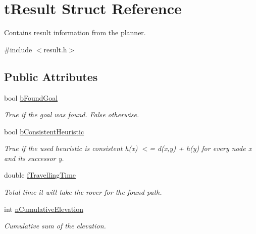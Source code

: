 \hypertarget{structt_result}{}\section{t\+Result Struct Reference}
\label{structt_result}


Contains result information from the planner.  




{\ttfamily \#include $<$result.\+h$>$}

\subsection*{Public Attributes}
\begin{DoxyCompactItemize}
\item 
\mbox{\label{structt_result_add525cabcdd568ffc72a25052d351042}} 
bool \mbox{\hyperlink{structt_result_add525cabcdd568ffc72a25052d351042}{b\+Found\+Goal}}
\begin{DoxyCompactList}\small\item\em True if the goal was found. False otherwise. \end{DoxyCompactList}\item 
bool \mbox{\hyperlink{structt_result_a7d87aab6411a466aed07a27a70eeded2}{b\+Consistent\+Heuristic}}
\begin{DoxyCompactList}\small\item\em True if the used heuristic is consistent h(x) $<$= d(x,y) + h(y) for every node x and its successor y. \end{DoxyCompactList}\item 
\mbox{\label{structt_result_ab3934006c8a2a92c5622cb9d4b246eba}} 
double \mbox{\hyperlink{structt_result_ab3934006c8a2a92c5622cb9d4b246eba}{f\+Travelling\+Time}}
\begin{DoxyCompactList}\small\item\em Total time it will take the rover for the found path. \end{DoxyCompactList}\item 
\mbox{\label{structt_result_a07f3f875dadb3075b1ca7f5e9dea66af}} 
int \mbox{\hyperlink{structt_result_a07f3f875dadb3075b1ca7f5e9dea66af}{n\+Cumulative\+Elevation}}
\begin{DoxyCompactList}\small\item\em Cumulative sum of the elevation. \end{DoxyCompactList}\item 

\end{DoxyCompactItemize}
